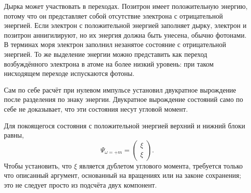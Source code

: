 \begin{classroomqa}
\end{classroomqa}

Дырка может участвовать в переходах. Позитрон имеет положительную энергию, потому что он представляет собой отсутствие электрона с отрицательной энергией. Если электрон с положительной энергией заполняет дырку, электрон и позитрон аннигилируют, но их энергия должна быть унесена, обычно фотонами. В терминах моря электрон заполнил незанятое состояние с отрицательной энергией. То же выделение энергии можно представить как переход возбуждённого электрона в атоме на более низкий уровень: при таком нисходящем переходе испускаются фотоны.

\begin{classroomqa}
\end{classroomqa}

Сам по себе расчёт при нулевом импульсе установил двукратное вырождение после разделения по знаку энергии. Двукратное вырождение состояний само по себе не доказывает, что эти состояния несут угловой момент.

\begin{classroomqa}
\end{classroomqa}

Для покоящегося состояния с положительной энергией верхний и нижний блоки равны,
\begin{equation}
\Psi_{\omega=+m}=
\begin{pmatrix}
\xi\\
\xi
\end{pmatrix}.
\end{equation}
Чтобы установить, что \(\xi\) является дублетом углового момента, требуется только что описанный аргумент, основанный на вращениях или на законе сохранения; это не следует просто из подсчёта двух компонент.

